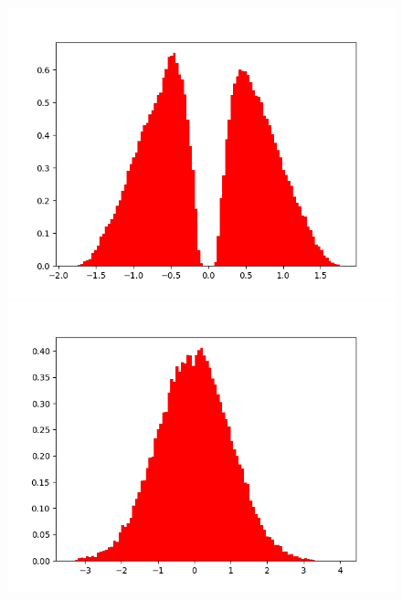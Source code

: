         
        \begin{figure}[H]
            \centering
            \begin{minipage}{.3\textwidth}
            
                \centering
                \includegraphics[width=.99\textwidth,trim={3cm 0 0 0},clip]{Chapters/Ch3-Simulations/normalizing_flows/pics/MeetingFigures/Bobby/QT/feature0_noQT.png}
                \includegraphics[width=.99\textwidth,trim={3cm 0 0 0},clip]{Chapters/Ch3-Simulations/normalizing_flows/pics/MeetingFigures/Bobby/QT/feature0.png}
        

\end{minipage}
\end{figure}
